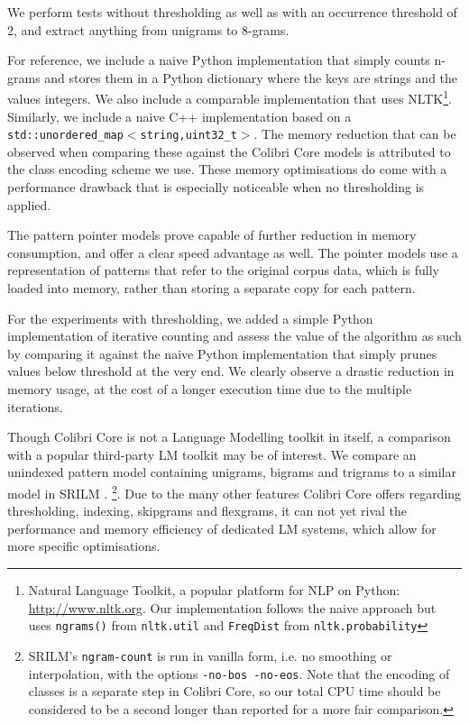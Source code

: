 We perform tests without thresholding as well as with an occurrence threshold
of $2$, and extract anything from unigrams to $8$-grams.

For reference, we include a naive Python implementation that simply counts
n-grams and stores them in a Python dictionary where the keys are strings and
the values integers. We also include a comparable implementation that uses
NLTK\footnote{Natural Language Toolkit, a popular platform for NLP on Python:
    \url{http://www.nltk.org}. Our implementation follows the naive approach
    but uses \texttt{ngrams()} from \texttt{nltk.util} and \texttt{FreqDist} from
\texttt{nltk.probability}}. Similarly, we include a naive C++ implementation based on
a \texttt{std::unordered\_map$<$string,uint32\_t$>$}. The memory reduction that can be
observed when comparing these against the Colibri Core models is attributed to
the class encoding scheme we use. These memory optimisations do come with a
performance drawback that is especially noticeable when no thresholding is
applied.

The pattern pointer models prove capable of further reduction in memory
consumption, and offer a clear speed advantage as well. The pointer models use a
representation of patterns that refer to the original corpus data, which is
fully loaded into memory, rather than storing a separate copy for each pattern.

For the experiments with thresholding, we added a simple Python implementation of
iterative counting and assess the value of the algorithm as such by comparing
it against the naive Python implementation that simply prunes values below
threshold at the very end. We clearly observe a drastic reduction in memory
usage, at the cost of a longer execution time due to the multiple iterations.

Though Colibri Core is not a Language Modelling toolkit in itself, a comparison
with a popular third-party LM toolkit may be of interest. We compare an
unindexed pattern model containing unigrams, bigrams and trigrams to a similar
model in SRILM \citep{SRILM}. \footnote{SRILM's \texttt{ngram-count} is run in
vanilla form, i.e. no smoothing or interpolation, with the options
\texttt{-no-bos -no-eos}. Note that the encoding of classes is a separate step in
Colibri Core, so our total CPU time should be considered to be a second longer
than reported for a more fair comparison.}. Due to the many other features
Colibri Core offers regarding thresholding, indexing, skipgrams and flexgrams, it
can not yet rival the performance and memory efficiency of dedicated LM systems,
which allow for more specific optimisations.

